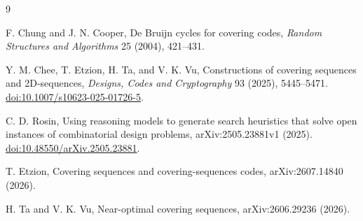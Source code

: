 \documentclass[11pt]{article}
\begin{document}
\begin{thebibliography}{9}

F. Chung and J. N. Cooper,
\newblock De Bruijn cycles for covering codes,
\newblock \emph{Random Structures and Algorithms} 25 (2004), 421--431.

Y. M. Chee, T. Etzion, H. Ta, and V. K. Vu,
\newblock Constructions of covering sequences and 2D-sequences,
\newblock \emph{Designs, Codes and Cryptography} 93 (2025), 5445--5471.
\newblock \href{https://doi.org/10.1007/s10623-025-01726-5}
{doi:10.1007/s10623-025-01726-5}.

C. D. Rosin,
\newblock Using reasoning models to generate search heuristics that solve
open instances of combinatorial design problems,
\newblock arXiv:2505.23881v1 (2025).
\newblock \href{https://doi.org/10.48550/arXiv.2505.23881}
{doi:10.48550/arXiv.2505.23881}.

T. Etzion,
\newblock Covering sequences and covering-sequences codes,
\newblock arXiv:2607.14840 (2026).

H. Ta and V. K. Vu,
\newblock Near-optimal covering sequences,
\newblock arXiv:2606.29236 (2026).

\end{thebibliography}
\end{document}

